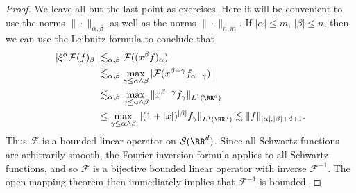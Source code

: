 \begin{proof}

	We leave all but the last point as exercises. Here it will be convenient to use the norms $\| \cdot \|_{\alpha,\beta}$ as well as the norms $\| \cdot \|_{n,m}$. If $|\alpha| \leq m$, $|\beta| \leq n$, then we can use the Leibnitz formula to conclude that
	\begin{align*}
		|\xi^\alpha \mathcal{F}(f)_\beta| &\lesssim_{\alpha,\beta} \mathcal{F}((x^\beta f)_\alpha)\\
		&\lesssim_{\alpha,\beta} \max_{\gamma \leq \alpha \wedge \beta} |\mathcal{F}(x^{\beta - \gamma} f_{\alpha - \gamma})|\\
		&\lesssim_{\alpha,\beta} \max_{\gamma \leq \alpha \wedge \beta} \| x^{\beta - \gamma} f_\gamma \|_{L^1(\RR^d)}\\
		&\leq \max_{\gamma \leq \alpha \wedge \beta} \| (1 + |x|)^{|\beta|} f_\gamma \|_{L^1(\RR^d)} \lesssim \| f \|_{|\alpha|,|\beta|+d+1}.
	\end{align*}
	Thus $\mathcal{F}$ is a bounded linear operator on $\mathcal{S}(\RR^d)$. Since all Schwartz functions are arbitrarily smooth, the Fourier inversion formula applies to all Schwartz functions, and so $\mathcal{F}$ is a bijective bounded linear operator with inverse $\mathcal{F}^{-1}$. The open mapping theorem then immediately implies that $\mathcal{F}^{-1}$ is bounded.
\end{proof}

